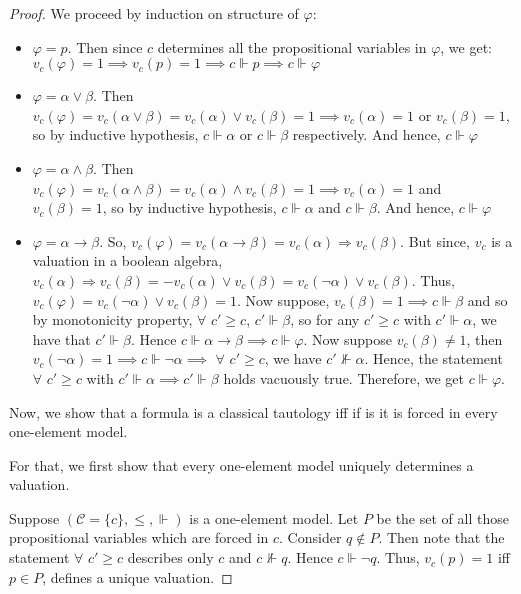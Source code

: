 \documentclass[12pt]{article}
\begin{document}
\begin{proof}
We proceed by induction on structure of $\varphi$:

\begin{itemize}
    \item $\varphi = p$. Then since $c$ determines all the propositional variables in $\varphi$, we get:  $v_c(\varphi) = 1 \implies v_c(p) = 1 \implies c \Vdash p \implies c \Vdash \varphi$
    
    \item $\varphi = \alpha \vee \beta$. Then $v_c(\varphi) = v_c(\alpha \vee \beta) = v_c(\alpha) \vee v_c(\beta) = 1 \implies v_c(\alpha) = 1$ or $v_c(\beta) = 1$, so by inductive hypothesis, $c \Vdash \alpha$ or $c \Vdash \beta$ respectively. And hence, $c \Vdash \varphi$
    
    \item $\varphi = \alpha \wedge \beta$. Then $v_c(\varphi) = v_c(\alpha \wedge \beta) = v_c(\alpha) \wedge v_c(\beta) = 1 \implies v_c(\alpha) = 1$ and $v_c(\beta) = 1$, so by inductive hypothesis, $c \Vdash \alpha$ and $c \Vdash \beta$. And hence, $c \Vdash \varphi$
    
    \item $\varphi = \alpha \rightarrow \beta$. So, $v_c(\varphi) = v_c(\alpha \rightarrow \beta) = v_c(\alpha) \Rightarrow v_c(\beta)$. But since, $v_c$ is a valuation in a boolean algebra, $v_c(\alpha) \Rightarrow v_c(\beta) = -v_c(\alpha) \vee v_c(\beta) = v_c(\neg \alpha) \vee v_c(\beta)$. Thus, $v_c(\varphi) = v_c(\neg \alpha) \vee v_c(\beta) = 1$. Now suppose, $v_c(\beta) = 1 \implies c \Vdash \beta$ and so by monotonicity property, $\forall$ $c' \geq c$, $c' \Vdash \beta$, so for any $c' \geq c$ with $c' \Vdash \alpha$, we have that $c' \Vdash \beta$. Hence $c \Vdash \alpha \rightarrow \beta \implies c \Vdash \varphi$. Now suppose $v_c(\beta) \neq 1$, then $v_c(\neg \alpha) = 1 \implies c \Vdash \neg \alpha \implies$ $\forall$ $c' \geq c$, we have $c' \not \Vdash \alpha$. Hence, the statement $\forall$ $c' \geq c$ with $c' \Vdash \alpha \implies c' \Vdash \beta$ holds vacuously true. Therefore, we get $c \Vdash \varphi$.
\end{itemize}

Now, we show that a formula is a classical tautology iff if is it is forced in every one-element model.

For that, we first show that every one-element model uniquely determines a valuation.

Suppose $(\mathcal{C} = \{c\}, \leq, \Vdash)$ is a one-element model. Let $P$ be the set of all those propositional variables which are forced in $c$. Consider $q \not \in P$. Then note that the statement $\forall$ $c' \geq c$ describes only $c$ and $c \not \Vdash q$. Hence $c \Vdash \neg q$. Thus, $v_c(p) = 1$ iff $p \in P$, defines a unique valuation.


\end{proof}
\end{document}
